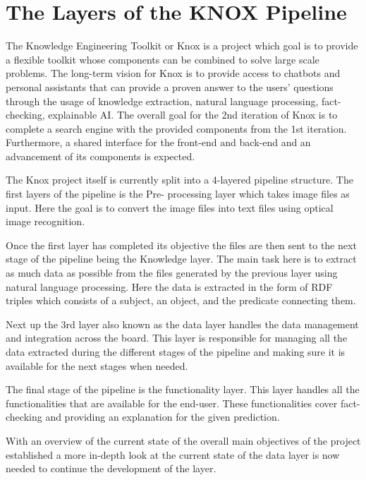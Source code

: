 \section{The Layers of the KNOX Pipeline}
The Knowledge Engineering Toolkit or Knox is a project which goal is to provide a flexible toolkit whose components can be combined 
to solve large scale problems. The long-term vision for Knox is to provide access to chatbots and personal assistants that can  
provide a proven answer to the users' questions through the usage of knowledge extraction, natural language processing, fact- 
checking, explainable AI.
The overall goal for the 2nd iteration of Knox is to complete a search engine with the provided components from the 1st iteration. 
Furthermore, a shared interface for the front-end and back-end and an advancement of its components is expected. 


The Knox project itself is currently split into a 4-layered pipeline structure. The first layers of the pipeline is the Pre-
processing layer which takes image files as input. Here the goal is to convert the image files into text files using optical image 
recognition. 


Once the first layer has completed its objective the files are then sent to the next stage of the pipeline being the Knowledge 
layer. The main task here is to extract as much data as possible from the files generated by the previous layer using natural 
language processing. Here the data is extracted in the form of RDF triples which consists of a subject, an object, and the predicate 
connecting them. 


Next up the 3rd layer also known as the data layer handles the data management and integration across the board. This layer is 
responsible for managing all the data extracted during the different stages of the pipeline and making sure it is available for the 
next stages when needed. 


The final stage of the pipeline is the functionality layer. This layer handles all the functionalities that are available for the 
end-user. These functionalities cover fact-checking and providing an explanation for the given prediction.


With an overview of the current state of the overall main objectives of the project  established a more in-depth look at the current 
state of the data layer is now needed to continue the development of the layer. 

